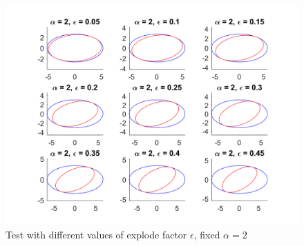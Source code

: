 \documentclass{article}
\begin{document}
\begin{figure}
\includegraphics[scale = 0.17]{fig/closed-form_maxAngle-test_epsilon.png}
\caption{Test with different values of explode factor $\epsilon$, fixed $\alpha = 2$}
\label{diff-epi}
\end{figure}
\end{document}
